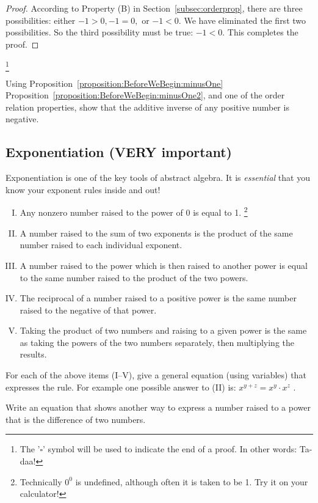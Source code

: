 \begin{proof}
\noindent
According to   Property (B) in  Section~\ref{subsec:orderprop}, there are three  possibilities: either $-1>0, -1=0,$ or $-1<0$.  We have eliminated the first two possibilities.  So the third possibility must be true:  $-1<0$. This completes the proof.

\end{proof} 
\footnote{The '$\square$' symbol will be used to indicate the end of a proof. In other words: Ta-daa!}

\begin{exercise}{}
Using Proposition~\ref{proposition:BeforeWeBegin:minusOne}  Proposition~\ref{proposition:BeforeWeBegin:minusOne2}, and one of the order relation properties, show that the additive inverse of any positive number is negative.
\end{exercise}


\subsection {Exponentiation (VERY important)}

Exponentiation is one of the key tools of abstract algebra. It is \emph{essential} that you know your exponent rules inside and out!  

\begin{enumerate}[(I)]
\item
Any nonzero number raised to the power of 0 is equal to 1.
\footnote{ Technically $0^0$ is undefined, although often it is taken to be 1. Try it on your calculator!}
\item
A number raised to the sum of two exponents  is the product of the same number raised to each individual exponent.
\item
A number raised to the power which is then raised to another power is equal to the same number raised to the product of the two powers.
\item
The reciprocal of a number raised to a positive power is the same number raised to the negative of that power.
\item
Taking the  product of two numbers  and raising to a given power is the same as taking the powers of the two numbers separately, then multiplying the results.
\end{enumerate}

\begin{exercise}{5}
For each of the above items (I--V),  give a general equation (using variables) that expresses the rule.  For example one possible answer to (II) is:  $x^{y+z} = x^y \cdot x^z$ .
\end{exercise}
\begin{exercise}{6}
Write an equation that shows another way to express a number raised to a power that is the difference of two numbers.
\end{exercise}

